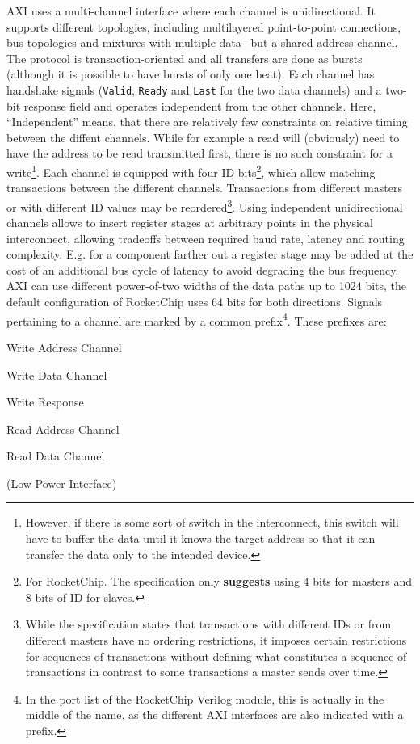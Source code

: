 \documentclass[journal,a4paper]{IEEEtran}
\begin{document}
AXI uses a multi-channel interface where each channel is unidirectional.
It supports different topologies, including multilayered point-to-point connections, bus topologies and mixtures with multiple data-- but a shared address channel.
The protocol is transaction-oriented and all transfers are done as bursts (although it is possible to have bursts of only one beat).
Each channel has handshake signals (\texttt{Valid}, \texttt{Ready} and \texttt{Last} for the two data channels) and a two-bit response field and operates independent from the other channels.
Here, ``Independent'' means, that there are relatively few constraints on relative timing between the diffent channels.
While for example a read will (obviously) need to have the address to be read transmitted first, there is no such constraint for a write\footnote{However, if there is some sort of switch in the interconnect, this switch will have to buffer the data until it knows the target address so that it can transfer the data only to the intended device.}.
Each channel is equipped with four ID bits\footnote{For RocketChip. The specification only \textbf{suggests} using 4 bits for masters and 8 bits of ID for slaves.}, which allow matching transactions between the different channels.
Transactions from different masters or with different ID values may be reordered\footnote{While the specification states that transactions with different IDs or from different masters have no ordering restrictions, it imposes certain restrictions for sequences of transactions\cite[5.3]{axi} without defining what constitutes a sequence of transactions in contrast to some transactions a master sends over time.}.
Using independent unidirectional channels allows to insert register stages at arbitrary points in the physical interconnect, allowing tradeoffs between required baud rate, latency and routing complexity. E.g. for a component farther out a register stage may be added at the cost of an additional bus cycle of latency to avoid degrading the bus frequency.
AXI can use different power-of-two widths of the data paths up to 1024 bits, the default configuration of RocketChip uses 64 bits for both directions.
Signals pertaining to a channel are marked by a common prefix\footnote{In the port list of the RocketChip Verilog module, this is actually in the middle of the name, as the different AXI interfaces are also indicated with a prefix.}.
These prefixes are:
%
\begin{description}
	\item[\texttt{\ldots\_aw\_\ldots}]   Write Address Channel
	\item[\texttt{\ldots\_w\_\ldots}]    Write Data Channel
	\item[\texttt{\ldots\_b\_\ldots}]    Write Response
	\item[\texttt{\ldots\_ar\_\ldots}]   Read Address Channel
	\item[\texttt{\ldots\_r\_\ldots}]    Read Data Channel
	\item[\texttt{\ldots\_c\_\ldots}]    (Low Power Interface)
\end{description}
\end{document}
